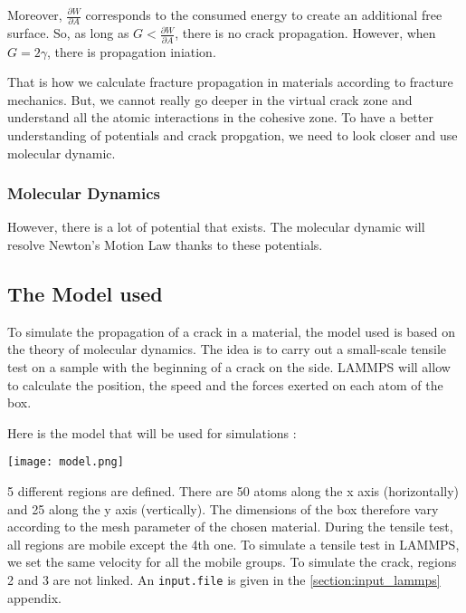             Moreover, $\frac{\partial W}{\partial A}$ corresponds to the consumed energy to create an additional free surface. So, as long as $G < \frac{\partial W}{\partial A}$, there is no crack propagation. However, when $G = 2\gamma$, there is propagation iniation.\medskip

            That is how we calculate fracture propagation in materials according to fracture mechanics. But, we cannot really go deeper in the virtual crack zone and understand all the atomic interactions in the \gls{cohesive zone}. To have a better understanding of potentials and crack propgation, we need to look closer and use \gls{molecular dynamic}.
        
        \subsubsection{Molecular Dynamics}
        
            However, there is a lot of potential that exists. The \gls{molecular dynamic} will resolve Newton's Motion Law thanks to these potentials. 

    \subsection{The Model used}
        To simulate the propagation of a crack in a material, the model used is based on the theory of molecular dynamics. The idea is to carry out a small-scale tensile test on a sample with the beginning of a crack on the side. LAMMPS will allow to calculate the position, the speed and the forces exerted on each atom of the box. \medskip
        
        Here is the model that will be used for simulations : 

        \begin{center}
            \captionsetup{type = figure}
            \texttt{[image: model.png]}
        \end{center}

        5 different regions are defined. There are 50 atoms along the x axis (horizontally) and 25 along the y axis (vertically). The dimensions of the box therefore vary according to the mesh parameter of the chosen material. During the tensile test, all regions are mobile except the 4th one. To simulate a tensile test in LAMMPS, we set the same velocity for all the mobile groups. To simulate the crack, regions 2 and 3 are not linked. An \verb|input.file| is given in the \ref{section:input_lammps} appendix.